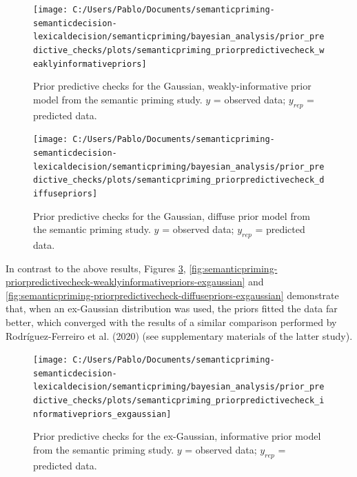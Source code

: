 \documentclass[
  12pt,
  man,floatsintext]{apa7}
\begin{document}
\begin{figure}

{\centering \texttt{[image: C:/Users/Pablo/Documents/semanticpriming-semanticdecision-lexicaldecision/semanticpriming/bayesian\_analysis/prior\_predictive\_checks/plots/semanticpriming\_priorpredictivecheck\_weaklyinformativepriors]} 

}

\caption{Prior predictive checks for the Gaussian, weakly-informative prior model from the semantic priming study. \(y\) = observed data; \(y_{rep}\) = predicted data.}\label{fig:semanticpriming-priorpredictivecheck-weaklyinformativepriors}
\end{figure}



\begin{figure}

{\centering \texttt{[image: C:/Users/Pablo/Documents/semanticpriming-semanticdecision-lexicaldecision/semanticpriming/bayesian\_analysis/prior\_predictive\_checks/plots/semanticpriming\_priorpredictivecheck\_diffusepriors]} 

}

\caption{Prior predictive checks for the Gaussian, diffuse prior model from the semantic priming study. \(y\) = observed data; \(y_{rep}\) = predicted data.}\label{fig:semanticpriming-priorpredictivecheck-diffusepriors}
\end{figure}

In contrast to the above results, Figures \ref{fig:semanticpriming-priorpredictivecheck-informativepriors-exgaussian}, \ref{fig:semanticpriming-priorpredictivecheck-weaklyinformativepriors-exgaussian} and \ref{fig:semanticpriming-priorpredictivecheck-diffusepriors-exgaussian} demonstrate that, when an ex-Gaussian distribution was used, the priors fitted the data far better, which converged with the results of a similar comparison performed by Rodríguez-Ferreiro et al. (2020) (see supplementary materials of the latter study).



\begin{figure}

{\centering \texttt{[image: C:/Users/Pablo/Documents/semanticpriming-semanticdecision-lexicaldecision/semanticpriming/bayesian\_analysis/prior\_predictive\_checks/plots/semanticpriming\_priorpredictivecheck\_informativepriors\_exgaussian]} 

}

\caption{Prior predictive checks for the ex-Gaussian, informative prior model from the semantic priming study. \(y\) = observed data; \(y_{rep}\) = predicted data.}\label{fig:semanticpriming-priorpredictivecheck-informativepriors-exgaussian}
\end{figure}
\end{document}
